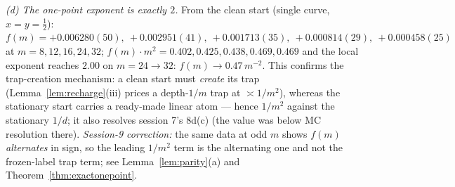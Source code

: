 \emph{(d) The one-point exponent is exactly $2$.}  From the clean
start (single curve, $x=y=\tfrac12$):
$f(m)=+0.006280(50),\ +0.002951(41),\ +0.001713(35),\
+0.000814(29),\ +0.000458(25)$ at $m=8,12,16,24,32$;
$f(m)\cdot m^2=0.402,0.425,0.438,0.469,0.469$ and the local exponent
reaches $2.00$ on $m=24\to32$: $f(m)\to0.47\,m^{-2}$.  This confirms
the trap-creation mechanism: a clean start must \emph{create} its
trap (Lemma~\ref{lem:recharge}(iii) prices a depth-$1/m$ trap at
$\asymp1/m^2$), whereas the stationary start carries a ready-made
linear atom --- hence $1/m^2$ against the stationary $1/d$; it also
resolves session 7's 8d(c) (the value was below MC resolution
there).  \emph{Session-9 correction:} the same data at odd $m$ shows
$f(m)$ \emph{alternates} in sign, so the leading $1/m^2$ term is the
alternating one and not the frozen-label trap term; see
Lemma~\ref{lem:parity}(a) and Theorem~\ref{thm:exactonepoint}.






